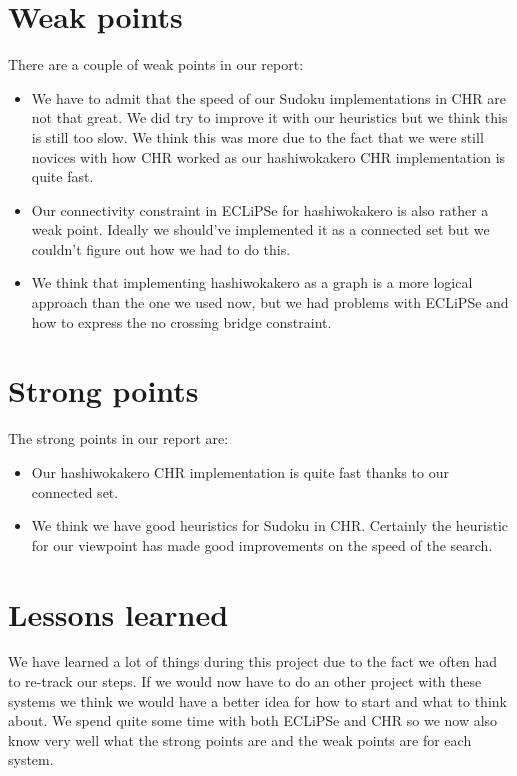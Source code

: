 \documentclass{report}
\begin{document}
\section{Weak points}
There are a couple of weak points in our report:
\begin{itemize}
    \item We have to admit that the speed of our Sudoku implementations in CHR are not that great. We did try to improve it with our heuristics but we think this is still too slow. We think this was more due to the fact that we were still novices with how CHR worked as our hashiwokakero CHR implementation is quite fast.
    \item Our connectivity constraint in ECLiPSe for hashiwokakero is also rather a weak point. Ideally we should've implemented it as a connected set but we couldn't figure out how we had to do this.
    \item We think that implementing hashiwokakero as a graph is a more logical approach than the one we used now, but we had problems with ECLiPSe and how to express the no crossing bridge constraint.
\end{itemize}
\section{Strong points}
The strong points in our report are:
\begin{itemize}
    \item Our hashiwokakero CHR implementation is quite fast thanks to our connected set.
    \item We think we have good heuristics for Sudoku in CHR. Certainly the heuristic for our viewpoint has made good improvements on the speed of the search.
\end{itemize}

\section{Lessons learned}
We have learned a lot of things during this project due to the fact we often had to re-track our steps. If we would now have to do an other project with these systems we think we would have a better idea for how to start and what to think about. We spend quite some time with both ECLiPSe and CHR so we now also know very well what the strong points are and the weak points are for each system.
\end{document}
